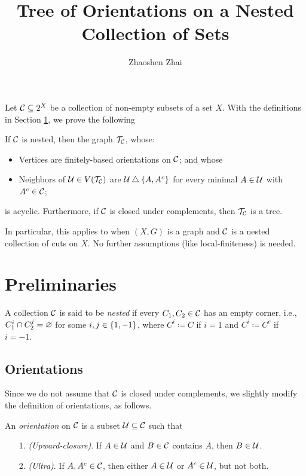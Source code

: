 \documentclass{amsart}
\begin{document}
    \title{Tree of Orientations on a Nested Collection of Sets}
    \author{Zhaoshen Zhai}
    \maketitle

    Let $\mc{C}\subseteq2^X$ be a collection of non-empty subsets of a set $X$. With the definitions in Section \ref{prelim}, we prove the following
    \begin{theorem*}
        If $\mc{C}$ is nested, then the graph $\mc{T}_\mc{C}$, whose:
        \begin{itemize}
            \item Vertices are finitely-based orientations on $\mc{C}$; and whose
            \item Neighbors of $\mc{U}\in V(\mc{T}_\mc{C})$ are $\mc{U}\symdiff\l\{A,A^c\r\}$ for every minimal $A\in\mc{U}$ with $A^c\in\mc{C}$;
        \end{itemize}
        is acyclic. Furthermore, if $\mc{C}$ is closed under complements, then $\mc{T}_\mc{C}$ is a tree.
    \end{theorem*}

    In particular, this applies to when $(X,G)$ is a graph and $\mc{C}$ is a nested collection of cuts on $X$. No further assumptions (like local-finiteness) is needed.

    \section{Preliminaries}\label{prelim}

    \begin{definition}
        A collection $\mc{C}$ is said to be \textit{nested} if every $C_1,C_2\in\mc{C}$ has an empty corner, i.e., $C_1^i\cap C_2^j=\em$ for some $i,j\in\l\{1,-1\r\}$, where $C^i\coloneqq C$ if $i=1$ and $C^i\coloneqq C^c$ if $i=-1$.
    \end{definition}

    \subsection{Orientations}

    Since we do not assume that $\mc{C}$ is closed under complements, we slightly modify the definition of orientations, as follows.

    \begin{definition}
        An \textit{orientation} on $\mc{C}$ is a subset $\mc{U}\subseteq\mc{C}$ such that
        \begin{enumerate}
            \item[1.] \textit{(Upward-closure)}. If $A\in\mc{U}$ and $B\in\mc{C}$ contains $A$, then $B\in\mc{U}$.
            \item[2.] \textit{(Ultra)}. If $A,A^c\in\mc{C}$, then either $A\in\mc{U}$ or $A^c\in\mc{U}$, but not both.
        \end{enumerate}
    \end{definition}
\end{document}
